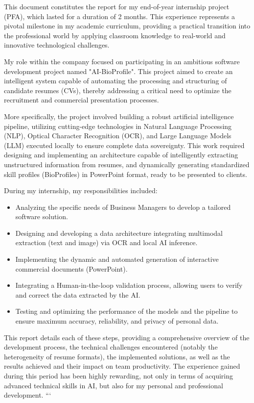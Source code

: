 

This document constitutes the report for my end-of-year internship project (PFA), which lasted for a duration of 2 months. This experience represents a pivotal milestone in my academic curriculum, providing a practical transition into the professional world by applying classroom knowledge to real-world and innovative technological challenges.

My role within the company focused on participating in an ambitious software development project named "AI-BioProfile". This project aimed to create an intelligent system capable of automating the processing and structuring of candidate resumes (CVs), thereby addressing a critical need to optimize the recruitment and commercial presentation processes.

More specifically, the project involved building a robust artificial intelligence pipeline, utilizing cutting-edge technologies in Natural Language Processing (NLP), Optical Character Recognition (OCR), and Large Language Models (LLM) executed locally to ensure complete data sovereignty. This work required designing and implementing an architecture capable of intelligently extracting unstructured information from resumes, and dynamically generating standardized skill profiles (BioProfiles) in PowerPoint format, ready to be presented to clients.

During my internship, my responsibilities included:
\begin{itemize}
    \item Analyzing the specific needs of Business Managers to develop a tailored software solution.
    \item Designing and developing a data architecture integrating multimodal extraction (text and image) via OCR and local AI inference.
    \item Implementing the dynamic and automated generation of interactive commercial documents (PowerPoint).
    \item Integrating a Human-in-the-loop validation process, allowing users to verify and correct the data extracted by the AI.
    \item Testing and optimizing the performance of the models and the pipeline to ensure maximum accuracy, reliability, and privacy of personal data.
\end{itemize}

This report details each of these steps, providing a comprehensive overview of the development process, the technical challenges encountered (notably the heterogeneity of resume formats), the implemented solutions, as well as the results achieved and their impact on team productivity. The experience gained during this period has been highly rewarding, not only in terms of acquiring advanced technical skills in AI, but also for my personal and professional development.
```